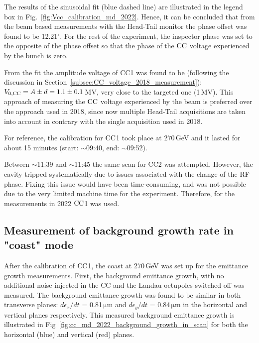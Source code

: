 The results of the sinusoidal fit (blue dashed line) are illustrated in the legend box in Fig.~\ref{fig:Vcc_calibration_md_2022}. Hence, it can be concluded that from the beam based measurements with the Head-Tail monitor the phase offset was found to be 12.21$^\circ$. For the rest of the experiment, the inspector phase was set to the opposite of the phase offset so that the phase of the ${\mathrm{CC}}$ voltage experienced by the bunch is zero. 


From the fit the amplitude voltage of CC1 was found to be (following the discussion in Section~\ref{subsec:CC_voltage_2018_measurement}): ${V_\mathrm{0, CC}}=A \pm d = 1.1 \pm 0.1$\,MV, very close to the targeted one (1\,MV). This approach of measuring the ${\mathrm{CC}}$ voltage experienced by the beam is preferred over the approach used in 2018, since now multiple Head-Tail acquisitions are taken into account in contrary with the single acquisition used in 2018.  



For reference, the calibration for ${\mathrm{CC}}$1 took place at 270\,GeV and it lasted for about 15 minutes (start: $\sim$09:40, end: $\sim$09:52).

Between $\sim$11:39 and $\sim$11:45 the same scan for CC2 was attempted. However, the cavity tripped systematically due to issues associated with the change of the RF phase. Fixing this issue would have been time-consuming, and was not possible due to the very limited machine time for the experiment. Therefore, for the measurements in 2022 ${\mathrm{CC}}$1 was used.


\subsection{Measurement of background growth rate in "coast" mode}\label{subsec:measured_background_growth_cc_md_2022}
After the calibration of ${\mathrm{CC}}$1, the coast at 270\,GeV was set up for the emittance growth measurements. First, the background emittance growth, with no additional noise injected in the CC and the Landau octupoles switched off was measured. The background emittance growth was found to be similar in both transverse planes: $d\epsilon_x /dt$ = 0.81\,$\mathrm{\mu m}$ and $d\epsilon_y /dt$ = 0.84\,$\mathrm{\mu m}$ in the horizontal and vertical planes respectively. This measured background emittance growth is illustrated in Fig~\ref{fig:cc_md_2022_background_growth_in_scan} for both the horizontal (blue) and vertical (red) planes.

